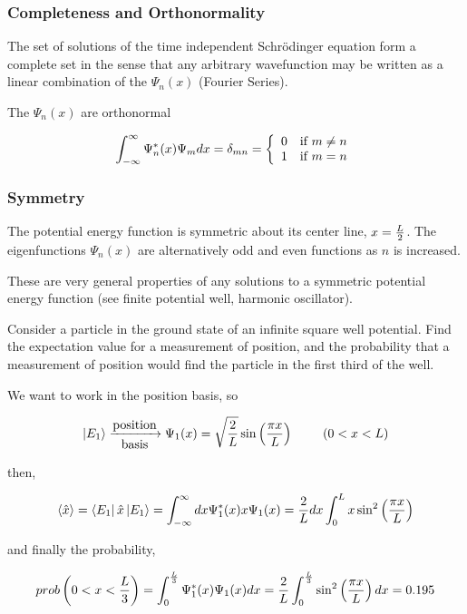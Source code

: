 \documentclass[english, 11pt]{article}
\begin{document}
      \subsubsection{Completeness and Orthonormality}

        The set of solutions of the time independent Schrödinger equation form a complete set in the sense that any arbitrary wavefunction may be written as a linear combination of the $\Psi_n(x)$ (Fourier Series). \newline

        The $\Psi_n(x)$ are orthonormal

        \[ \int_{-\infty}^{\infty} \Psi_{n}^*(x)\Psi_{m} dx = \delta_{mn} = \left\{ \begin{array}{lr} 0 & \mbox{if $m \not = n$} \\ 1 & \mbox{if $m = n$} \end{array} \right. \]

      \subsubsection{Symmetry}

        The potential energy function is symmetric about its center line, $x = \frac{L}{2}$. The eigenfunctions $\Psi_n(x)$ are alternatively odd and even functions as $n$ is increased.\newline

      These are very general properties of any solutions to a symmetric potential energy function (see finite potential well, harmonic oscillator).

      \begin{exmp}
        Consider a particle in the ground state of an infinite square well potential. Find the expectation value for a measurement of position, and the probability that a measurement of position would find the particle in the first third of the well.
      \end{exmp}

      We want to work in the position basis, so

      \[ \left|E_1\right\rangle \xrightarrow[\mbox{basis}]{\mbox{position}} \Psi_1(x) = \sqrt{\frac{2}{L}}\sin \left( \frac{\pi x}{L} \right) \ \ \ \ \ \ \ (0 < x < L) \]

      then,

      \[ \langle \hat{x} \rangle = \left\langle E_1\right|\hat{x}\left|E_1\right\rangle = \int_{-\infty}^{\infty} dx \Psi_1^*(x)x\Psi_1(x) = \frac{2}{L} dx \int_0^L x\sin^2 \left( \frac{\pi x}{L} \right) \]

      and finally the probability,

      \[ prob\left(0<x<\frac{L}{3}\right) = \int_0^{\frac{L}{3}}\Psi_1^*(x)\Psi_1(x)dx = \frac{2}{L} \int_0^{\frac{L}{3}} \sin^2 \left( \frac{\pi x}{L}\right) dx = 0.195  \]
\end{document}
